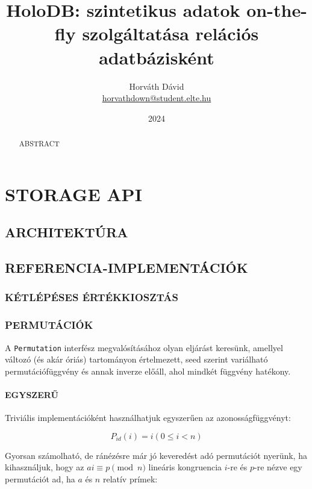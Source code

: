 \documentclass[
    parspace,
    noindent,
    nohyp,
]{elteiktdk}[2023/04/10]
\title{HoloDB: szintetikus adatok on-the-fly szolgáltatása relációs adatbázisként}
\date{2024}
\author{Horváth Dávid \\ {\small\href{mailto:horvathdown@student.elte.hu}{horvathdown@student.elte.hu}} }
\affiliation{Mesteroktató}
\begin{document}

\listoftodos
\cleardoublepage

\makecover
\cleardoublepage

\maketitle

\tableofcontents
\cleardoublepage


\begin{abstract}
ABSTRACT
\end{abstract}



\chapter{STORAGE API}

\section{ARCHITEKTÚRA}

\section{REFERENCIA-IMPLEMENTÁCIÓK}

\subsection{KÉTLÉPÉSES ÉRTÉKKIOSZTÁS}

\subsection{PERMUTÁCIÓK}

A \texttt{Permutation} interfész megvalósításához olyan eljárást keresünk, amellyel változó (és akár óriás) tartományon értelmezett,
seed szerint variálható permutációfüggvény és annak inverze előáll, ahol mindkét függvény hatékony.

\subsubsection{EGYSZERŰ}

Triviális implementációként használhatjuk egyszerűen az azonosságfüggvényt:

$$
P_{id}(i) = i (0 \leq i < n)
$$

Gyorsan számolható, de ránézésre már jó keveredést adó permutációt nyerünk, ha kihasználjuk, hogy az $ai \equiv p \pmod{n}$ lineáris kongruencia
$i$-re és $p$-re nézve egy permutációt ad, ha $a$ és $n$ relatív prímek:
\end{document}
